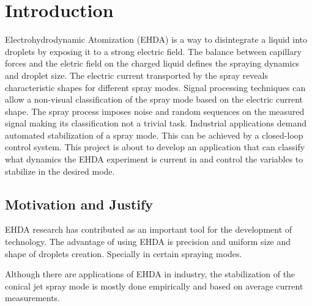 \chapter{Introduction}
\label{chap:intro} 

Electrohydrodynamic Atomization (EHDA) is a way to disintegrate a liquid into droplets by exposing it to a strong electric field.\cite{prunet}
The balance between capillary forces and the eletric field on the charged liquid defines the spraying dynamics and droplet size.
The electric current transported by the spray reveals characteristic shapes for different spray modes.
Signal processing techniques can allow a non-visual classification of the spray mode based on the electric current shape.\cite{Sjaaks}
The spray process imposes noise and random sequences on the measured signal making its classification not a trivial task. 
Industrial applications demand automated stabilization of a spray mode. 
This can be achieved by a closed-loop control system. 
This project is about to develop an application that can classify what dynamics the EHDA experiment is current in and control the variables to stabilize in the desired mode. 


\section{Motivation and Justify}
\label{sec:motivacao}


EHDA research has contributed as an important tool for the development of technology. 
The advantage of using EHDA is precision and uniform size and shape of droplets creation. Specially in certain spraying modes.

Although there are applications of EHDA in industry, the stabilization of the conical jet spray mode is mostly done empirically and based on average current measurements.


